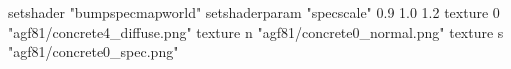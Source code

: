 setshader "bumpspecmapworld"
setshaderparam "specscale" 0.9 1.0 1.2
   texture 0 "agf81/concrete4_diffuse.png"
   texture n "agf81/concrete0_normal.png"
   texture s "agf81/concrete0_spec.png"